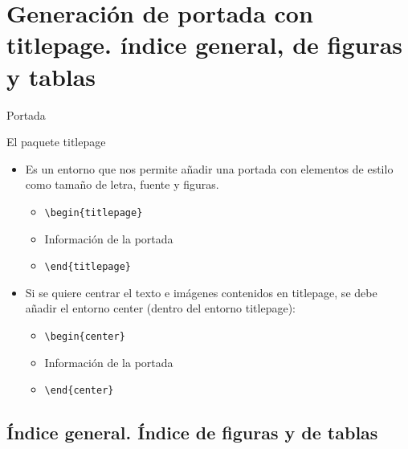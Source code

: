 \documentclass[aspectratio=169, 10pt]{beamer}
\begin{document}
\section{Generación de portada con titlepage. índice general, de figuras y tablas}
\begin{frame}[fragile]{Portada}

    \begin{exampleblock}{El paquete titlepage}
    \begin{itemize}
        \item Es un entorno que nos permite añadir una portada con elementos de estilo como tamaño de letra, fuente y figuras.
        \begin{itemize}
            \item \verb|\begin{titlepage}|
            \item \hspace{3mm} Información de la portada
            \item \verb|\end{titlepage}|
        \end{itemize}
        \item Si se quiere centrar el texto e imágenes contenidos en titlepage, se debe añadir el entorno center (dentro del entorno titlepage):
        \begin{itemize}
            \item \verb|\begin{center}|
            \item \hspace{3mm} Información de la portada
            \item \verb|\end{center}|
        \end{itemize}
        
    \end{itemize}
\end{exampleblock}
   
\end{frame}

\subsection{Índice general. Índice de figuras y de tablas}
\end{document}
